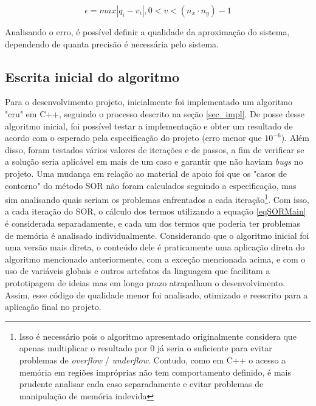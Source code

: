 \documentclass[oneside]{abntex2}
\begin{document}
\begin{equation}
\label{eqError}
    \epsilon = max|q_i - v_i|, 0<v<(n_x \cdot n_y) - 1
\end{equation}

Analisando o erro, é possível definir a qualidade da aproximação do sistema, dependendo de quanta precisão é necessária pelo sistema.

\subsection{Escrita inicial do algoritmo} \label{subsec_alg_init}
Para o desenvolvimento projeto, inicialmente foi implementado um algoritmo "cru" em C++, seguindo o processo descrito na seção \ref{sec_impl}. De posse desse algoritmo inicial, foi possível testar a implementação e obter um resultado de acordo com o esperado pela especificação do projeto (erro menor que $10^{-6}$). Além disso, foram testados vários valores de iterações e de passos, a fim de verificar se a solução seria aplicável em mais de um caso e garantir que não haviam \textit{bugs} no projeto. Uma mudança em relação ao material de apoio foi que os "casos de contorno" do método SOR não foram calculados seguindo a especificação, mas sim analisando quais seriam os problemas enfrentados a cada iteração\footnote{Isso é necessário pois o algoritmo apresentado originalmente considera que apenas multiplicar o resultado por 0 já seria o suficiente para evitar problemas de \textit{overflow} / \textit{underflow}. Contudo, como em C++ o acesso a memória em regiões impróprias não tem comportamento definido, é mais prudente analisar cada caso separadamente e evitar problemas de manipulação de memória indevida}. Com isso, a cada iteração do SOR, o cálculo dos termos utilizando a equação \ref{eqSORMain} é considerada separadamente, e cada um dos termos que poderia ter problemas de memória é analisado individualmente. Considerando que o algoritmo inicial foi uma versão mais direta, o conteúdo dele é praticamente uma aplicação direta do algoritmo mencionado anteriormente, com a exceção mencionada acima, e com o uso de variáveis globais e outros artefatos da linguagem que facilitam a prototipagem de ideias mas em longo prazo atrapalham o desenvolvimento. Assim, esse código de qualidade menor foi analisado, otimizado e reescrito para a aplicação final no projeto.
\end{document}
